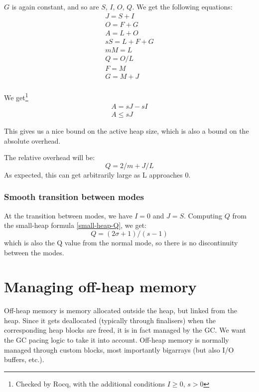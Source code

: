 \documentclass{article}
\begin{document}
$G$ is again constant, and so are $S$, $I$, $O$, $Q$. We get the
following equations:
\begin{gather*}
J = S + I      \\
O = F + G      \\
A = L + O      \\
sS = L + F + G \\
mM = L \\
Q = O/L \\
F = M \\
G = M + J \\
\end{gather*}

We get\footnote{Checked by Rocq, with the additional conditions
$I \ge 0$,
$s > 0$
}
\begin{gather*}
A = sJ - sI \\
A \leq sJ
\end{gather*}


This gives us a nice bound on the active heap size, which is also a
bound on the absolute overhead.

The relative overhead will be:
\begin{equation}\label{small-heap-Q}
  Q = 2/m + J/L
\end{equation}
As expected, this can get arbitrarily large as L approaches 0.

\subsubsection{Smooth transition between modes}

At the transition between modes, we have $I = 0$ and $J =
S$. Computing $Q$ from the small-heap formula \eqref{small-heap-Q}, we
get:
\begin{equation}
  Q = (2\sigma+1)/(s-1)
\end{equation}
which is also the Q value from the normal mode, so there is no
discontinuity between the modes.


\section{Managing off-heap memory}

Off-heap memory is memory allocated outside the heap, but linked from
the heap. Since it gets deallocated (typically through finalisers)
when the corresponding heap blocks are freed, it is in fact managed by
the GC. We want the GC pacing logic to take it into account. Off-heap
memory is normally managed through custom blocks, most importantly
bigarrays (but also I/O buffers, etc.).
\end{document}
